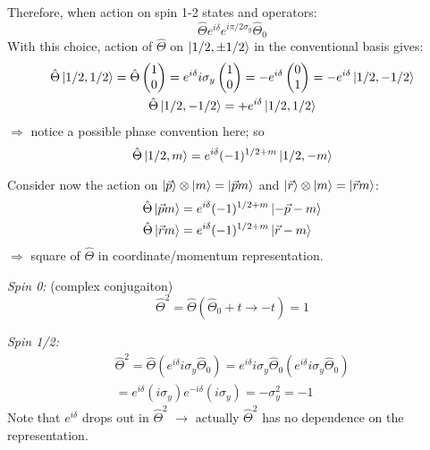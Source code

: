 \documentclass[12pt]{article}
\newcommand{\be}{\begin{equation}}
\newcommand{\ee}{\end{equation}}
\begin{document}
Therefore, when action on spin 1-2 states and operators:
\be
\hat{\Theta}e^{i \delta} e^{i \pi / 2 \sigma_{y}}\hat{\Theta}_0
\ee
With this choice, action of $\hat{\Theta}$ on $\ket{1/2,\pm1/2}$ in the
conventional basis gives:
\be
\begin{gathered}
\hat{\Theta} \ket{1/2,1/2} = \hat{\Theta}\begin{pmatrix}1\\0\end{pmatrix}
= e^{i \delta} i \sigma_{y} \begin{pmatrix}1\\0\end{pmatrix} = -e^{i \delta} \begin{pmatrix}0\\1\end{pmatrix} = -e^{i \delta} \ket{1/2,-1/2}\\
\hat{\Theta} \ket{1/2,-1/2} = + e^{i \delta} \ket{1/2,1/2}
\end{gathered}
\ee
$\Rightarrow$ notice a possible phase convention here; so
\be
\hat{\Theta} \ket{1/2,m} = e^{i \delta} (-1)^{1/2+m} \ket{1/2,-m}
\ee

Consider now the action on $\ket{\vec{p}} \otimes \ket{m} = \ket{\vec{p}m}$ and
$\ket{\vec{r}} \otimes \ket{m} = \ket{\vec{r}m}$:
\be
\begin{aligned}
\hat{\Theta} \ket{\vec{p}m} &= e^{i \delta} (-1)^{1/2+m} \ket{-\vec{p}-m}\\
\hat{\Theta} \ket{\vec{r}m} &= e^{i \delta} (-1)^{1/2+m} \ket{ \vec{r}-m}
\end{aligned}
\ee
$\Rightarrow$ square of $\hat{\Theta}$ in coordinate/momentum representation.

\emph{Spin 0:} (complex conjugaiton)
\be
\hat{\Theta}^2 = \hat{\Theta}(\hat{\Theta}_0+t\to-t) = 1
\ee

\emph{Spin 1/2:}
\be
\begin{gathered}
\hat{\Theta}^2 =  \hat{\Theta}(e^{i \delta} i \sigma_y \hat{\Theta}_0)
= e^{i \delta} i \sigma_y \hat{\Theta}_0 (e^{i \delta} i \sigma_y \hat{\Theta}_0)\\
= e^{i \delta} (i \sigma_y) e^{-i \delta} (i \sigma_y) = -\sigma_y^2 = -1
\end{gathered}
\ee
Note that $e^{i \delta}$ drops out in $\hat{\Theta}^2$ $\to$ actually $\hat{\Theta}^2$ has no dependence
on the representation.
\end{document}

